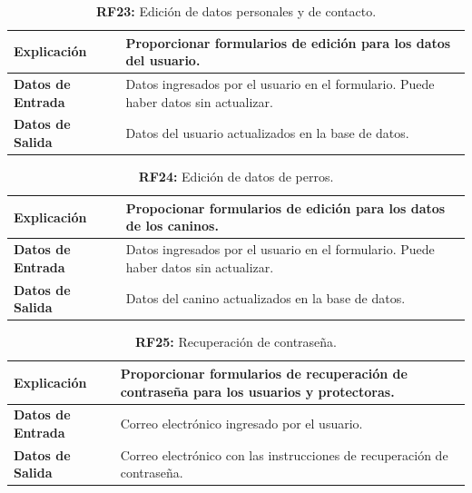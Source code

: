 \documentclass[a4paper, 12pt]{article}
\begin{document}
\begin{table}[H]
\captionsetup{justification=raggedright,singlelinecheck=false}
\caption{\textbf{RF23:} Edición de datos personales y de contacto.}
\label{tab:RF23}
	\begin{tabular}{|m{5cm}|m{10cm}|}
	\hline
	\textbf{Explicación} & Proporcionar formularios de edición para los datos del usuario. \\ 
	\hline
	\textbf{Datos de Entrada} & Datos ingresados por el usuario en el formulario. Puede haber datos sin actualizar. \\ 
	\hline
	\textbf{Datos de Salida} &  Datos del usuario actualizados en la base de datos. \\ 
	\hline
\end{tabular}
\end{table}

\begin{table}[H]
\captionsetup{justification=raggedright,singlelinecheck=false}
\caption{\textbf{RF24:} Edición de datos de perros.}
\label{tab:RF24}
	\begin{tabular}{|m{5cm}|m{10cm}|}
	\hline
	\textbf{Explicación} & Propocionar formularios de edición para los datos de los caninos. \\ 
	\hline
	\textbf{Datos de Entrada} &  Datos ingresados por el usuario en el formulario. Puede haber datos sin actualizar.  \\ 
	\hline
	\textbf{Datos de Salida} &   Datos del canino actualizados en la base de datos. \\ 
	\hline
\end{tabular}
\end{table}

\begin{table}[H]
\captionsetup{justification=raggedright,singlelinecheck=false}
\caption{\textbf{RF25:} Recuperación de contraseña.}
\label{tab:RF25}
	\begin{tabular}{|m{5cm}|m{10cm}|}
	\hline
	\textbf{Explicación} & Proporcionar formularios de recuperación de contraseña para los usuarios y protectoras. \\ 
	\hline
	\textbf{Datos de Entrada} & Correo electrónico ingresado por el usuario. \\ 
	\hline
	\textbf{Datos de Salida} & Correo electrónico con las instrucciones de recuperación de contraseña. \\ 
	\hline
\end{tabular}
\end{table}
\end{document}
